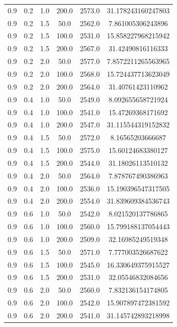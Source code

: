 \begin{tabular}{cccccc}
0.9 & 0.2 & 1.0 & 200.0 & 2573.0 & 31.178243160247803 \\
0.9 & 0.2 & 1.5 & 50.0 & 2562.0 & 7.861005306243896 \\
0.9 & 0.2 & 1.5 & 100.0 & 2531.0 & 15.858227968215942 \\
0.9 & 0.2 & 1.5 & 200.0 & 2567.0 & 31.42490816116333 \\
0.9 & 0.2 & 2.0 & 50.0 & 2577.0 & 7.8572211265563965 \\
0.9 & 0.2 & 2.0 & 100.0 & 2568.0 & 15.724437713623049 \\
0.9 & 0.2 & 2.0 & 200.0 & 2564.0 & 31.40761423110962 \\
0.9 & 0.4 & 1.0 & 50.0 & 2549.0 & 8.092655658721924 \\
0.9 & 0.4 & 1.0 & 100.0 & 2541.0 & 15.47269368171692 \\
0.9 & 0.4 & 1.0 & 200.0 & 2547.0 & 31.115544319152832 \\
0.9 & 0.4 & 1.5 & 50.0 & 2572.0 & 8.16565203666687 \\
0.9 & 0.4 & 1.5 & 100.0 & 2575.0 & 15.60124683380127 \\
0.9 & 0.4 & 1.5 & 200.0 & 2544.0 & 31.18026113510132 \\
0.9 & 0.4 & 2.0 & 50.0 & 2564.0 & 7.878767490386963 \\
0.9 & 0.4 & 2.0 & 100.0 & 2536.0 & 15.190396547317505 \\
0.9 & 0.4 & 2.0 & 200.0 & 2554.0 & 31.839609384536743 \\
0.9 & 0.6 & 1.0 & 50.0 & 2542.0 & 8.021520137786865 \\
0.9 & 0.6 & 1.0 & 100.0 & 2560.0 & 15.799188137054443 \\
0.9 & 0.6 & 1.0 & 200.0 & 2509.0 & 32.16985249519348 \\
0.9 & 0.6 & 1.5 & 50.0 & 2571.0 & 7.777003526687622 \\
0.9 & 0.6 & 1.5 & 100.0 & 2545.0 & 16.330649375915527 \\
0.9 & 0.6 & 1.5 & 200.0 & 2531.0 & 32.05546832084656 \\
0.9 & 0.6 & 2.0 & 50.0 & 2560.0 & 7.832136154174805 \\
0.9 & 0.6 & 2.0 & 100.0 & 2542.0 & 15.907897472381592 \\
0.9 & 0.6 & 2.0 & 200.0 & 2541.0 & 31.145742893218998 \\
\end{tabular}
